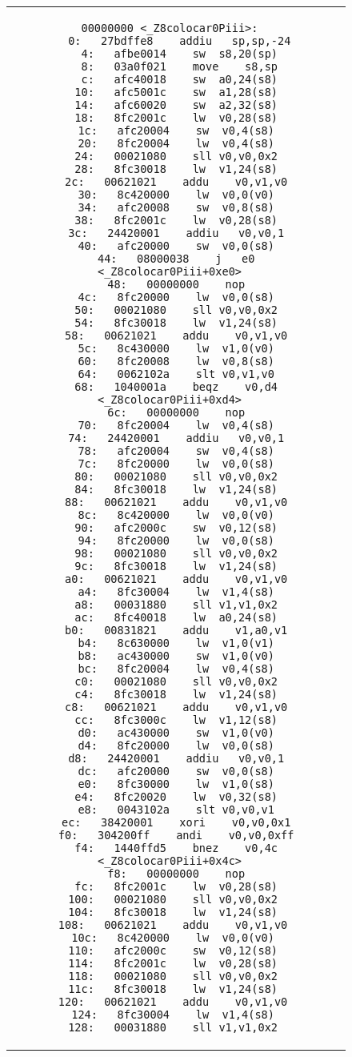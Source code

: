 \begin{figure}
\begin{center}
\begin{tabular}{c c}
	\begin{minipage}[t]{.4\textwidth}
		\begin{lstlisting}[language={[mips]Assembler},caption=colocar0,basicstyle=\ttfamily\tiny, tabsize=2]
00000000 <_Z8colocar0Piii>:
   0:	27bdffe8 	addiu	sp,sp,-24
   4:	afbe0014 	sw	s8,20(sp)
   8:	03a0f021 	move	s8,sp
   c:	afc40018 	sw	a0,24(s8)
  10:	afc5001c 	sw	a1,28(s8)
  14:	afc60020 	sw	a2,32(s8)
  18:	8fc2001c 	lw	v0,28(s8)
  1c:	afc20004 	sw	v0,4(s8)
  20:	8fc20004 	lw	v0,4(s8)
  24:	00021080 	sll	v0,v0,0x2
  28:	8fc30018 	lw	v1,24(s8)
  2c:	00621021 	addu	v0,v1,v0
  30:	8c420000 	lw	v0,0(v0)
  34:	afc20008 	sw	v0,8(s8)
  38:	8fc2001c 	lw	v0,28(s8)
  3c:	24420001 	addiu	v0,v0,1
  40:	afc20000 	sw	v0,0(s8)
  44:	08000038 	j	e0 <_Z8colocar0Piii+0xe0>
  48:	00000000 	nop
  4c:	8fc20000 	lw	v0,0(s8)
  50:	00021080 	sll	v0,v0,0x2
  54:	8fc30018 	lw	v1,24(s8)
  58:	00621021 	addu	v0,v1,v0
  5c:	8c430000 	lw	v1,0(v0)
  60:	8fc20008 	lw	v0,8(s8)
  64:	0062102a 	slt	v0,v1,v0
  68:	1040001a 	beqz	v0,d4 <_Z8colocar0Piii+0xd4>
  6c:	00000000 	nop
  70:	8fc20004 	lw	v0,4(s8)
  74:	24420001 	addiu	v0,v0,1
  78:	afc20004 	sw	v0,4(s8)
  7c:	8fc20000 	lw	v0,0(s8)
  80:	00021080 	sll	v0,v0,0x2
  84:	8fc30018 	lw	v1,24(s8)
  88:	00621021 	addu	v0,v1,v0
  8c:	8c420000 	lw	v0,0(v0)
  90:	afc2000c 	sw	v0,12(s8)
  94:	8fc20000 	lw	v0,0(s8)
  98:	00021080 	sll	v0,v0,0x2
  9c:	8fc30018 	lw	v1,24(s8)
  a0:	00621021 	addu	v0,v1,v0
  a4:	8fc30004 	lw	v1,4(s8)
  a8:	00031880 	sll	v1,v1,0x2
  ac:	8fc40018 	lw	a0,24(s8)
  b0:	00831821 	addu	v1,a0,v1
  b4:	8c630000 	lw	v1,0(v1)
  b8:	ac430000 	sw	v1,0(v0)
  bc:	8fc20004 	lw	v0,4(s8)
  c0:	00021080 	sll	v0,v0,0x2
  c4:	8fc30018 	lw	v1,24(s8)
  c8:	00621021 	addu	v0,v1,v0
  cc:	8fc3000c 	lw	v1,12(s8)
  d0:	ac430000 	sw	v1,0(v0)
  d4:	8fc20000 	lw	v0,0(s8)
  d8:	24420001 	addiu	v0,v0,1
  dc:	afc20000 	sw	v0,0(s8)
  e0:	8fc30000 	lw	v1,0(s8)
  e4:	8fc20020 	lw	v0,32(s8)
  e8:	0043102a 	slt	v0,v0,v1
  ec:	38420001 	xori	v0,v0,0x1
  f0:	304200ff 	andi	v0,v0,0xff
  f4:	1440ffd5 	bnez	v0,4c <_Z8colocar0Piii+0x4c>
  f8:	00000000 	nop
  fc:	8fc2001c 	lw	v0,28(s8)
 100:	00021080 	sll	v0,v0,0x2
 104:	8fc30018 	lw	v1,24(s8)
 108:	00621021 	addu	v0,v1,v0
 10c:	8c420000 	lw	v0,0(v0)
 110:	afc2000c 	sw	v0,12(s8)
 114:	8fc2001c 	lw	v0,28(s8)
 118:	00021080 	sll	v0,v0,0x2
 11c:	8fc30018 	lw	v1,24(s8)
 120:	00621021 	addu	v0,v1,v0
 124:	8fc30004 	lw	v1,4(s8)
 128:	00031880 	sll	v1,v1,0x2

\end{lstlisting}
\end{minipage}
\end{tabular}
\end{center}
\end{figure}
